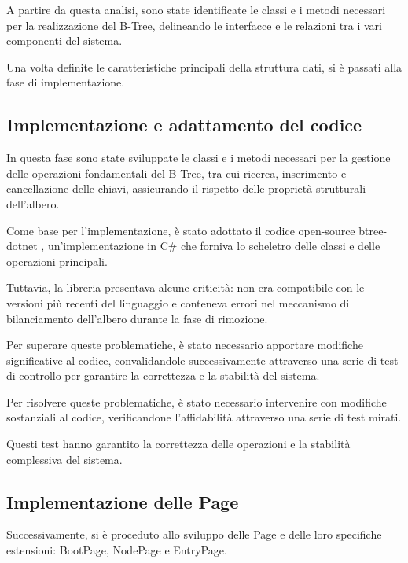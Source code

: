 \documentclass[12pt,a4paper,openright,twoside]{book}
\begin{document}
                A partire da questa analisi, sono state identificate le classi e i metodi necessari per la realizzazione del B-Tree, delineando le interfacce e le relazioni tra i vari componenti del sistema.

                Una volta definite le caratteristiche principali della struttura dati, si è passati alla fase di implementazione.

            \subsection{Implementazione e adattamento del codice}

                In questa fase sono state sviluppate le classi e i metodi necessari per la gestione delle operazioni fondamentali del B-Tree, tra cui ricerca, inserimento e cancellazione delle chiavi, assicurando il rispetto delle proprietà strutturali dell’albero.

                Come base per l’implementazione, è stato adottato il codice open-source btree-dotnet \cite{rsdcastro_btree_dotnet}, un’implementazione in C\# che forniva lo scheletro delle classi e delle operazioni principali.

                Tuttavia, la libreria presentava alcune criticità: non era compatibile con le versioni più recenti del linguaggio e conteneva errori nel meccanismo di bilanciamento dell’albero durante la fase di rimozione.

                Per superare queste problematiche, è stato necessario apportare modifiche significative al codice, convalidandole successivamente attraverso una serie di test di controllo per garantire la correttezza e la stabilità del sistema.

                Per risolvere queste problematiche, è stato necessario intervenire con modifiche sostanziali al codice, verificandone l’affidabilità attraverso una serie di test mirati.

                Questi test hanno garantito la correttezza delle operazioni e la stabilità complessiva del sistema.

            \subsection{Implementazione delle Page}
                Successivamente, si è proceduto allo sviluppo delle Page e delle loro specifiche estensioni: BootPage, NodePage e EntryPage.

                
\end{document}
